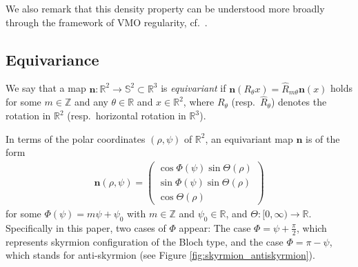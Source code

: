 \documentclass{amsart}
\numberwithin{equation}{section}
\theoremstyle{definition}
\theoremstyle{remark}
\newcommand{\R}{\mathbb{R}}
\newcommand{\Z}{\mathbb{Z}}
\renewcommand{\S}{\mathbb{S}}
\newcommand{\bn}{{\mathbf{n}}}
\begin{document}
We also remark that this density property can be understood more broadly through the framework of VMO regularity, cf.\ \cite[Theorem 2.1]{MR2376670}.




\subsection{Equivariance}
We say that a map $\bn:\R^2\to\S^2\subset\R^3$ is \emph{equivariant} if $\bn(R_\theta x)=\hat{R}_{m\theta}\bn(x)$ holds for some $m\in\Z$ and any $\theta\in\R$ and $x\in\R^2$, where $R_\theta$ (resp.\ $\hat{R}_\theta$) denotes the rotation in $\R^2$ (resp.\ horizontal rotation in $\R^3$).

In terms of the polar coordinates $(\rho,\psi)$ of $\R^2$, an equivariant map $\bn$ is of the form
\begin{align*}
\bn(\rho,\psi) = 
\begin{pmatrix}
\cos\Phi(\psi) \sin \Theta (\rho)\\
\sin\Phi(\psi) \sin \Theta (\rho)\\
\cos \Theta (\rho)
\end{pmatrix}
\end{align*}
for some $\Phi(\psi)=m\psi+\psi_0$ with $m\in\Z$ and $\psi_0\in\R$, and 
$\Theta:[0,\infty) \to \R$.
Specifically in this paper, two cases of $\Phi$ appear: The case $\Phi=
\psi+\frac \pi2$,
which represents skyrmion configuration of the Bloch type, and the case $\Phi=
\pi-\psi$, which stands for anti-skyrmion (see Figure \ref{fig:skyrmion_antiskyrmion}).
\end{document}
